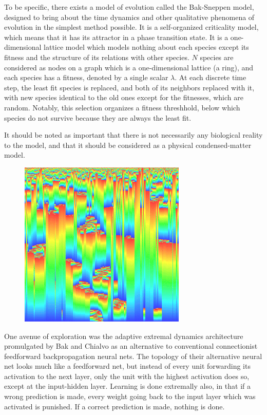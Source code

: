 \documentclass[12pt]{article}
\begin{document}
To be specific, there exists a model of evolution called the Bak-Sneppen model, designed to bring about the time dynamics and other qualitative phenomena of evolution in the simplest method possible. It is a self-organized criticality model, which means that it has its attractor in a phase transition state. It is a one-dimensional lattice model which models nothing about each species except its fitness and the structure of its relations with other species. $N$ species are considered as nodes on a graph which is a one-dimensional lattice (a ring), and each species has a fitness, denoted by a single scalar $\lambda$. At each discrete time step, the least fit species is replaced, and both of its neighbors replaced with it, with new species identical to the old ones except for the fitnesses, which are random. Notably, this selection organizes a fitness threshhold, below which species do not survive because they are always the least fit.

It should be noted as important that there is not necessarily any biological reality to the model, and that it should be considered as a physical condensed-matter model.

\begin{figure}
  \includegraphics{bak_sneppen}
\end{figure}

One avenue of exploration was the adaptive extremal dynamics architecture promulgated by Bak and Chialvo as an alternative to conventional connectionist feedforward backpropagation neural nets. The topology of their alternative neural net looks much like a feedforward net, but instead of every unit forwarding its activation to the next layer, only the unit with the highest activation does so, except at the input-hidden layer. Learning is done extremally also, in that if a wrong prediction is made, every weight going back to the input layer which was activated is punished. If a correct prediction is made, nothing is done.
\end{document}
